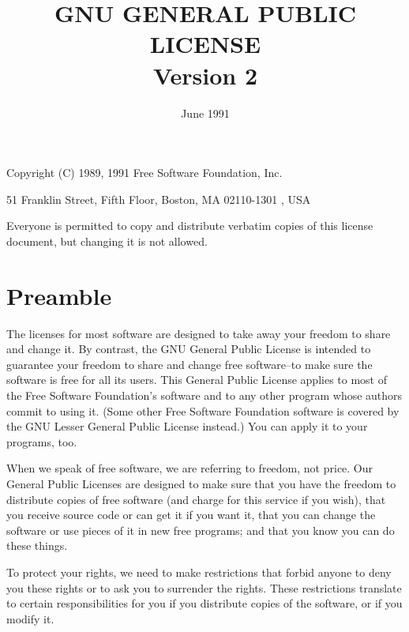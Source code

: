\documentclass[a4paper, 12pt]{article}
\begin{document}
\title{GNU GENERAL PUBLIC LICENSE \\ Version 2}
\date{June 1991}

\maketitle

Copyright (C) 1989, 1991 Free Software Foundation, Inc.

\vspace{0.3cm}

51 Franklin Street, Fifth Floor, Boston, MA 02110-1301 , USA

\vspace{0.3cm}

Everyone is permitted to copy and distribute verbatim copies of this license document, but changing it is not allowed.

\section*{Preamble}

The licenses for most software are designed to take away your freedom to share and change it. By contrast, the GNU General Public License is intended to guarantee your freedom to share and change free software--to make sure the software is free for all its users. This General Public License applies to most of the Free Software Foundation's software and to any other program whose authors commit to using it. (Some other Free Software Foundation software is covered by the GNU Lesser General Public License instead.) You can apply it to your programs, too.

\vspace{0.3cm}

When we speak of free software, we are referring to freedom, not price. Our General Public Licenses are designed to make sure that you have the freedom to distribute copies of free software (and charge for this service if you wish), that you receive source code or can get it if you want it, that you can change the software or use pieces of it in new free programs; and that you know you can do these things.

\vspace{0.3cm}

To protect your rights, we need to make restrictions that forbid anyone to deny you these rights or to ask you to surrender the rights. These restrictions translate to certain responsibilities for you if you distribute copies of the software, or if you modify it.
\end{document}
